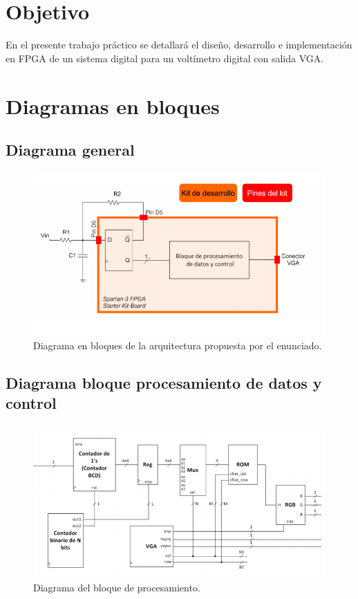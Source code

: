 \documentclass[a4paper,10pt]{article}
\begin{document}

\newpage
\tableofcontents
\newpage
\section{Objetivo}
En el presente trabajo práctico se detallará el diseño, desarrollo e implementación en FPGA de un sistema digital para un voltímetro digital con salida VGA.
\section{Diagramas en bloques}
	\subsection{Diagrama general}
	\begin{figure}[h]
		\centering
		\includegraphics{img/general.png}
		\caption{Diagrama en bloques de la arquitectura propuesta por el enunciado.}
	\end{figure}
	\subsection{Diagrama bloque procesamiento de datos y control}
		\begin{figure}[h]
		\centering
		\includegraphics[width=13cm]{img/fpga.png}
		\caption{Diagrama del bloque de procesamiento.}
	\end{figure}
\end{document}
